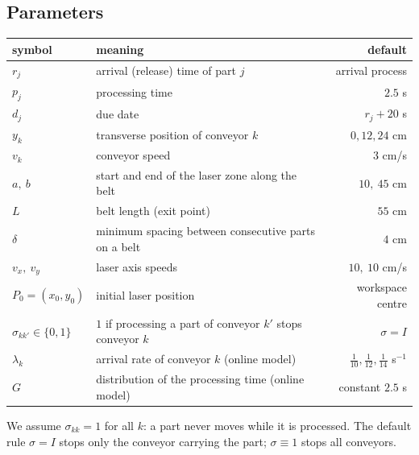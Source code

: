 \documentclass[11pt,a4paper]{article}
\theoremstyle{definition}
\theoremstyle{remark}
\begin{document}
\subsection{Parameters}
\begin{tabularx}{\linewidth}{@{}l X r@{}}
\toprule
symbol & meaning & default\\
\midrule
$r_j$ & arrival (release) time of part $j$ & arrival process\\
$p_j$ & processing time & $2.5$ s\\
$d_j$ & due date & $r_j+20$ s\\
$y_k$ & transverse position of conveyor $k$ & $0,12,24$ cm\\
$v_k$ & conveyor speed & $3$ cm/s\\
$a,\ b$ & start and end of the laser zone along the belt & $10,\ 45$ cm\\
$L$ & belt length (exit point) & $55$ cm\\
$\delta$ & minimum spacing between consecutive parts on a belt & $4$ cm\\
$v_x,\ v_y$ & laser axis speeds & $10,\ 10$ cm/s\\
$P_0=(x_0,y_0)$ & initial laser position & workspace centre\\
$\sigma_{kk'}\in\{0,1\}$ & $1$ if processing a part of conveyor $k'$ stops conveyor $k$ & $\sigma=I$\\
$\lambda_k$ & arrival rate of conveyor $k$ (online model) & $\tfrac1{10},\tfrac1{12},\tfrac1{14}$ s$^{-1}$\\
$G$ & distribution of the processing time (online model) & constant $2.5$ s\\
\bottomrule
\end{tabularx}

We assume $\sigma_{kk}=1$ for all $k$: a part never moves while it is processed.
The default rule $\sigma=I$ stops only the conveyor carrying the part; $\sigma\equiv 1$
stops all conveyors.
\end{document}
